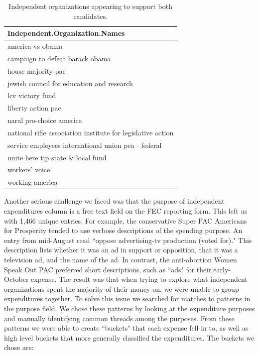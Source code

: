 \documentclass[11pt]{article}\usepackage{graphicx, color}
\begin{document}
\begin{table}[ht]
\begin{center}
\begin{tabular}{l}
  \hline
Independent.Organization.Names \\ 
  \hline
america vs obama \\ 
  campaign to defeat barack obama \\ 
  house majority pac \\ 
  jewish council for education and research \\ 
  lcv victory fund \\ 
  liberty action pac \\ 
  naral pro-choice america \\ 
  national rifle association institute for legislative action \\ 
  service employees international union pea - federal \\ 
  unite here tip state \& local fund \\ 
  workers' voice \\ 
  working america \\ 
   \hline
\end{tabular}
\caption{Independent organizations appearing to support both candidates.}
\label{tab:prob_spe}
\end{center}
\end{table}



Another serious challenge we faced was that the purpose of independent expenditures column is a free text field on the FEC reporting form.  This left us with 1,466 unique entries. For example, the conservative Super PAC Americans for Prosperity tended to use verbose descriptions of the spending purpose. An entry from mid-August read ``oppose advertising-tv production (voted for)." This description lists whether it was an ad in support or opposition, that it was a television ad, and the name of the ad. In contrast, the anti-abortion Women Speak Out PAC preferred short descriptions, such as ``ads" for their early-October expense. The result was that when trying to explore what independent organizations spent the majority of their money on, we were unable to group expenditures together. To solve this issue we searched for matches to patterns in the purpose field. We chose these patterns by looking at the expenditure purposes and manually identifying common threads among the purposes. From these patterns we were able to create ``buckets" that each expense fell in to, as well as high level buckets that more generally classified the expenditures. The buckets we chose are: 
\end{document}
